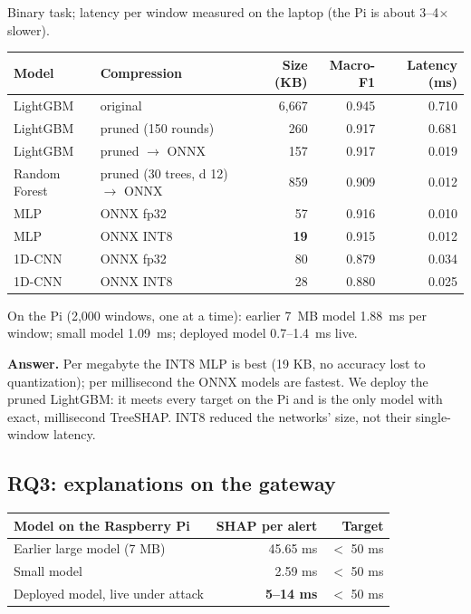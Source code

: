 \documentclass[11pt,a4paper]{article}
\newcommand{\dep}{\rowcolor{gray!18}}
\newcommand{\answer}[1]{\par\noindent\colorbox{accent!8}{\parbox{\dimexpr\linewidth-2\fboxsep}{\vspace{0.4em}\textbf{Answer.} #1\vspace{0.4em}}}\par}
\begin{document}
Binary task; latency per window measured on the laptop (the Pi is about 3--4$\times$ slower).

\begin{center}
\small
\begin{tabular}{llrrr}
\toprule
Model & Compression & Size (KB) & Macro-F1 & Latency (ms) \\
\midrule
LightGBM & original & 6,667 & 0.945 & 0.710 \\
LightGBM & pruned (150 rounds) & 260 & 0.917 & 0.681 \\
LightGBM & pruned $\rightarrow$ ONNX & 157 & 0.917 & 0.019 \\
Random Forest & pruned (30 trees, d 12) $\rightarrow$ ONNX & 859 & 0.909 & 0.012 \\
MLP & ONNX fp32 & 57 & 0.916 & 0.010 \\
MLP & ONNX INT8 & \textbf{19} & 0.915 & 0.012 \\
1D-CNN & ONNX fp32 & 80 & 0.879 & 0.034 \\
1D-CNN & ONNX INT8 & 28 & 0.880 & 0.025 \\
\bottomrule
\end{tabular}
\end{center}

On the Pi (2,000 windows, one at a time): earlier 7~MB model 1.88~ms per window; small model 1.09~ms; deployed model
0.7--1.4~ms live.

\answer{Per megabyte the INT8 MLP is best (19 KB, no accuracy lost to quantization); per millisecond the ONNX models
are fastest. We deploy the pruned LightGBM: it meets every target on the Pi and is the only model with exact,
millisecond TreeSHAP. INT8 reduced the networks' size, not their single-window latency.}

\subsection{RQ3: explanations on the gateway}

\begin{center}
\small
\begin{tabular}{lrr}
\toprule
Model on the Raspberry Pi & SHAP per alert & Target \\
\midrule
Earlier large model (7 MB) & 45.65 ms & $<$ 50 ms \\
Small model & 2.59 ms & $<$ 50 ms \\
\dep Deployed model, live under attack & \textbf{5--14 ms} & $<$ 50 ms \\
\bottomrule
\end{tabular}
\end{center}
\end{document}
